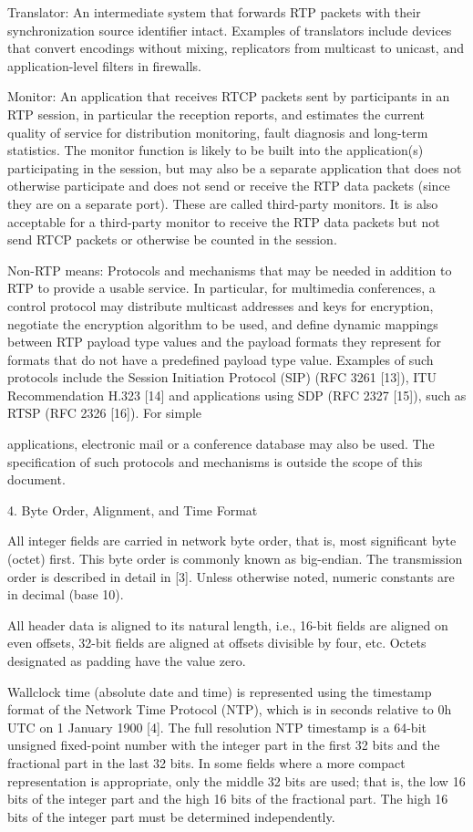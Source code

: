 \documentclass{article}
\begin{document}
Translator: An intermediate system that forwards RTP packets with their synchronization source identifier intact.  Examples of translators include devices that convert encodings without mixing, replicators from multicast to unicast, and application-level filters in firewalls.

Monitor: An application that receives RTCP packets sent by participants in an RTP session, in particular the reception reports, and estimates the current quality of service for distribution monitoring, fault diagnosis and long-term statistics. The monitor function is likely to be built into the application(s) participating in the session, but may also be a separate application that does not otherwise participate and does not send or receive the RTP data packets (since they are on a separate port).  These are called third-party monitors.  It is also acceptable for a third-party monitor to receive the RTP data packets but not send RTCP packets or otherwise be counted in the session.

Non-RTP means: Protocols and mechanisms that may be needed in addition to RTP to provide a usable service.  In particular, for multimedia conferences, a control protocol may distribute multicast addresses and keys for encryption, negotiate the encryption algorithm to be used, and define dynamic mappings between RTP payload type values and the payload formats they represent for formats that do not have a predefined payload type value.  Examples of such protocols include the Session Initiation Protocol (SIP) (RFC 3261 [13]), ITU Recommendation H.323 [14] and applications using SDP (RFC 2327 [15]), such as RTSP (RFC 2326 [16]).  For simple

applications, electronic mail or a conference database may also be used.  The specification of such protocols and mechanisms is outside the scope of this document.

4. Byte Order, Alignment, and Time Format

All integer fields are carried in network byte order, that is, most significant byte (octet) first.  This byte order is commonly known as big-endian.  The transmission order is described in detail in [3]. Unless otherwise noted, numeric constants are in decimal (base 10).

All header data is aligned to its natural length, i.e., 16-bit fields are aligned on even offsets, 32-bit fields are aligned at offsets divisible by four, etc.  Octets designated as padding have the value zero.

Wallclock time (absolute date and time) is represented using the timestamp format of the Network Time Protocol (NTP), which is in seconds relative to 0h UTC on 1 January 1900 [4].  The full resolution NTP timestamp is a 64-bit unsigned fixed-point number with the integer part in the first 32 bits and the fractional part in the last 32 bits.  In some fields where a more compact representation is appropriate, only the middle 32 bits are used; that is, the low 16 bits of the integer part and the high 16 bits of the fractional part. The high 16 bits of the integer part must be determined independently.
\end{document}
